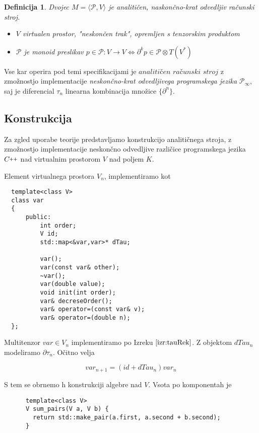 \documentclass{article}
\newcommand{\CC}{C\nolinebreak\hspace{-.05em}\raisebox{.4ex}{\tiny\bf +}\nolinebreak\hspace{-.10em}\raisebox{.4ex}{\tiny\bf +}}
\def\CC{{C\nolinebreak[4]\hspace{-.05em}\raisebox{.4ex}{\tiny\bf ++}}}
\newcommand{\dP}{\mathcal{P}}
\newcommand{\D}{\partial}
\newcommand{\sumd}{\tau}
\newtheorem{definicija}{Definicija}[section]
\begin{document}
\begin{definicija}
   Dvojec $M=\langle\dP, V\rangle$ je analitičen, naskončno-krat odvedljiv računski stroj.
   
    \begin{itemize}
    \item
    $V$ virtualen prostor, "neskončen trak", opremljen s tenzorskim produktom
    \item
    $\dP$ je monoid preslikav $p\in\dP:V\to V\iff\D^k p\in \dP\otimes T(V^*)$
    \end{itemize}
  \end{definicija}
  Vse kar operira pod temi specifikacijami je $\textit{analitičen računski stroj}$ z zmožnostjo implementacije \textit{neskončno-krat odvedljivega programskega jezika} $\dP_\infty$, saj je diferencial $\sumd_n$ linearna kombinacija množice $\{\D^n\}$. 
  
  \subsection{Konstrukcija}
  Za zgled uporabe teorije predstavljamo konstrukcijo analitičnega stroja, z zmožnostjo implementacije neskončno odvedljive različice programskega jezika $\CC$ nad virtualnim prostorom $V$ nad poljem $K$.
  
  Element virtualnega prostora $V_n$, implementiramo kot
  
  \begin{lstlisting}
  template<class V>
  class var
  {
      public:
      	  int order;
          V id;
          std::map<&var,var>* dTau;
  
          var();
          var(const var& other);
          ~var();
          var(double value);
          void init(int order);
          var& decreseOrder();
          var& operator=(const var& v);
          var& operator=(double n);
  };       
  \end{lstlisting}
  
  Multitenzor $var\in V_n$ implementiramo po Izreku $\ref{izr:tauRek}$. Z objektom $dTau_n$ modeliramo $\D\sumd_{n}$. Očitno velja
  
  \begin{equation}\label{eq:var}
  var_{n+1}=(id+dTau_n)var_{n}
  \end{equation}
  
  S tem se obrnemo h konstrukciji algebre nad $V$. Vsota po komponentah je
    
    \begin{lstlisting}
      template<class V>
      V sum_pairs(V a, V b) {
        return std::make_pair(a.first, a.second + b.second);
      }
      \end{lstlisting}
      
\end{document}
